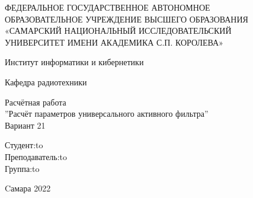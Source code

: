 \begin{titlepage}
\newpage
\doublespacing
\begin{center}
ФЕДЕРАЛЬНОЕ ГОСУДАРСТВЕННОЕ АВТОНОМНОЕ\\
ОБРАЗОВАТЕЛЬНОЕ УЧРЕЖДЕНИЕ ВЫСШЕГО ОБРАЗОВАНИЯ\\
«САМАРСКИЙ НАЦИОНАЛЬНЫЙ ИССЛЕДОВАТЕЛЬСКИЙ\\
УНИВЕРСИТЕТ ИМЕНИ АКАДЕМИКА С.П. КОРОЛЕВА»	
 \\
\end{center}

\vspace{5em}

\begin{center}
 Институт информатики и кибернетики \\ 
\end{center}

\begin{center}
Кафедра радиотехники \\ 
\end{center}


\vspace{3em}

\begin{center}
{Расчётная работа\\ ''Расчёт параметров универсального активного фильтра''\\ Вариант 21}
\end{center}

\vspace{14em}



\newbox{\lbox}
\newlength{\maxl}
\setlength{\maxl}{\wd\lbox}
\hfill\parbox{6cm}{
\hspace*{4cm}\hspace*{-4cm}Студент:\hfill\hbox to\\
\hspace*{4cm}\hspace*{-4cm}Преподаватель:\hfill\hbox to\\
\hspace*{4cm}\hspace*{-4cm}Группа:\hfill\hbox to\\
}


\vspace{\fill}

\begin{center}
Cамара 2022
\end{center}

\end{titlepage}